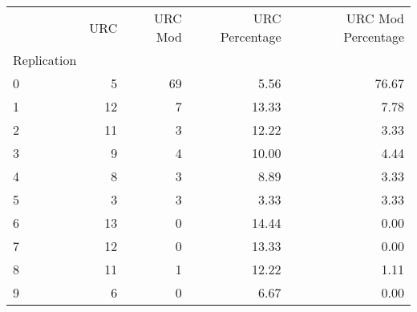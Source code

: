 \begin{tabular}{lrrrr}
\toprule
 & URC & URC Mod & URC Percentage & URC Mod Percentage \\
Replication &  &  &  &  \\
\midrule
0 & 5 & 69 & 5.56 & 76.67 \\
1 & 12 & 7 & 13.33 & 7.78 \\
2 & 11 & 3 & 12.22 & 3.33 \\
3 & 9 & 4 & 10.00 & 4.44 \\
4 & 8 & 3 & 8.89 & 3.33 \\
5 & 3 & 3 & 3.33 & 3.33 \\
6 & 13 & 0 & 14.44 & 0.00 \\
7 & 12 & 0 & 13.33 & 0.00 \\
8 & 11 & 1 & 12.22 & 1.11 \\
9 & 6 & 0 & 6.67 & 0.00 \\
\bottomrule
\end{tabular}
